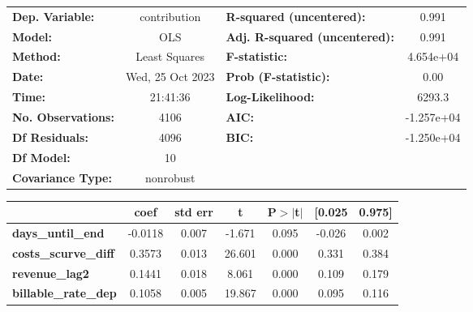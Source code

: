 \begin{center}
\begin{tabular}{lclc}
\toprule
\textbf{Dep. Variable:}                   &   contribution   & \textbf{  R-squared (uncentered):}      &     0.991   \\
\textbf{Model:}                           &       OLS        & \textbf{  Adj. R-squared (uncentered):} &     0.991   \\
\textbf{Method:}                          &  Least Squares   & \textbf{  F-statistic:       }          & 4.654e+04   \\
\textbf{Date:}                            & Wed, 25 Oct 2023 & \textbf{  Prob (F-statistic):}          &     0.00    \\
\textbf{Time:}                            &     21:41:36     & \textbf{  Log-Likelihood:    }          &    6293.3   \\
\textbf{No. Observations:}                &        4106      & \textbf{  AIC:               }          & -1.257e+04  \\
\textbf{Df Residuals:}                    &        4096      & \textbf{  BIC:               }          & -1.250e+04  \\
\textbf{Df Model:}                        &          10      & \textbf{                     }          &             \\
\textbf{Covariance Type:}                 &    nonrobust     & \textbf{                     }          &             \\
\bottomrule
\end{tabular}
\begin{tabular}{lcccccc}
                                          & \textbf{coef} & \textbf{std err} & \textbf{t} & \textbf{P$> |$t$|$} & \textbf{[0.025} & \textbf{0.975]}  \\
\midrule
\textbf{days\_until\_end}                 &      -0.0118  &        0.007     &    -1.671  &         0.095        &       -0.026    &        0.002     \\
\textbf{costs\_scurve\_diff}              &       0.3573  &        0.013     &    26.601  &         0.000        &        0.331    &        0.384     \\
\textbf{revenue\_lag2}                    &       0.1441  &        0.018     &     8.061  &         0.000        &        0.109    &        0.179     \\
\textbf{billable\_rate\_dep}              &       0.1058  &        0.005     &    19.867  &         0.000        &        0.095    &        0.116     \\

\end{tabular}
\end{center}
